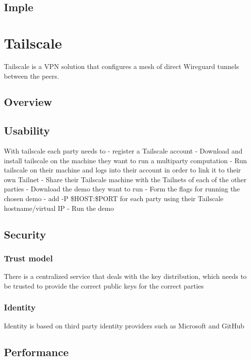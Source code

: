 \hypertarget{imple}{%
\section{Imple}\label{imple}}

\hypertarget{tailscale}{%
\chapter{Tailscale}\label{tailscale}}

Tailscale is a VPN solution that configures a mesh of direct Wireguard
tunnels between the peers.

\hypertarget{overview}{%
\section{Overview}\label{overview}}

\hypertarget{usability}{%
\section{Usability}\label{usability}}

With tailscale each party needs to - register a Tailscale account -
Download and install tailscale on the machine they want to run a
multiparty computation - Run tailscale on their machine and logs into
their account in order to link it to their own Tailnet - Share their
Tailscale machine with the Tailnets of each of the other parties -
Download the demo they want to run - Form the flags for running the
chosen demo - add -P \$HOST:\$PORT for each party using their Tailscale
hostname/virtual IP - Run the demo

\hypertarget{security}{%
\section{Security}\label{security}}

\hypertarget{trust-model}{%
\subsection{Trust model}\label{trust-model}}

There is a centralized service that deals with the key distribution,
which needs to be trusted to provide the correct public keys for the
correct parties

\hypertarget{identity}{%
\subsection{Identity}\label{identity}}

Identity is based on third party identity providers such as Microsoft
and GitHub

\hypertarget{performance}{%
\section{Performance}\label{performance}}
